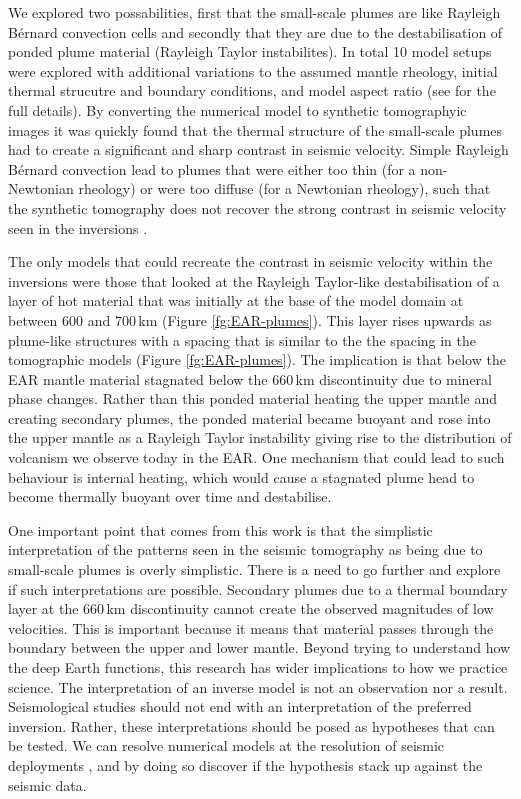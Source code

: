 We explored two possabilities, first that the small-scale plumes are like Rayleigh Bérnard convection cells and secondly that they are due to the destabilisation of ponded plume material (Rayleigh Taylor instabilites). In total 10 model setups were explored with additional variations to the assumed mantle rheology, initial thermal strucutre and boundary conditions, and model aspect ratio (see \citealp{civiero-etal-2019} for the full details). By converting the numerical model to synthetic tomographyic images it was quickly found that the thermal structure of the small-scale plumes had to create a significant and sharp contrast in seismic velocity. Simple Rayleigh Bérnard convection lead to plumes that were either too thin (for a non-Newtonian rheology) or were too diffuse (for a Newtonian rheology), such that the synthetic tomography does not recover the strong contrast in seismic velocity seen in the inversions \citep{civiero-etal-2018}.

The only models that could recreate the contrast in seismic velocity within the inversions were those that looked at the Rayleigh Taylor-like destabilisation of a layer of hot material that was initially at the base of the model domain at between 600 and 700\,km (Figure \ref{fg:EAR-plumes}). This layer rises upwards as plume-like structures with a spacing that is similar to the the spacing in the tomographic models (Figure \ref{fg:EAR-plumes}). The implication is that below the EAR mantle material stagnated below the 660\,km discontinuity due to mineral phase changes. Rather than this ponded material heating the upper mantle and creating secondary plumes, the ponded material became buoyant and rose into the upper mantle as a Rayleigh Taylor instability giving rise to the distribution of volcanism we observe today in the EAR. One mechanism that could lead to such behaviour is internal heating, which would cause a stagnated plume head to become thermally buoyant over time and destabilise.

One important point that comes from this work is that the simplistic interpretation of the patterns seen in the seismic tomography as being due to small-scale plumes is overly simplistic. There is a need to go further and explore if such interpretations are possible. Secondary plumes due to a thermal boundary layer at the 660\,km discontinuity cannot create the observed magnitudes of low velocities. This is important because it means that material passes through the boundary between the upper and lower mantle. Beyond trying to understand how the deep Earth functions, this research has wider implications to how we practice science. The interpretation of an inverse model is not an observation nor a result. Seismological studies should not end with an interpretation of the preferred inversion. Rather, these interpretations should be posed as hypotheses that can be tested. We can resolve numerical models at the resolution of seismic deployments \citep[e.g.][]{goes-etal-2012,civiero-etal-2019}, and by doing so discover if the hypothesis stack up against the seismic data.

